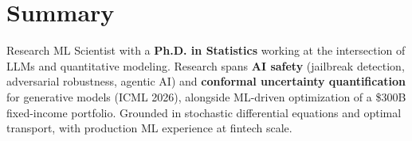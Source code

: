 \section{Summary}
Research ML Scientist with a \textbf{Ph.D. in Statistics} working at the intersection of LLMs and quantitative modeling. Research spans \textbf{AI safety} (jailbreak detection, adversarial robustness, agentic AI) and \textbf{conformal uncertainty quantification} for generative models (ICML 2026), alongside ML-driven optimization of a \$300B fixed-income portfolio. Grounded in stochastic differential equations and optimal transport, with production ML experience at fintech scale.
